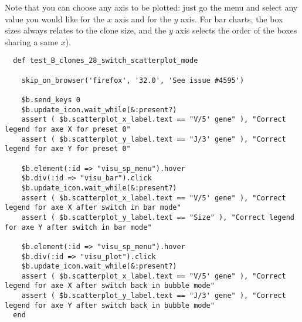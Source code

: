 Note that you can choose any axis to be plotted: just go the  menu and
select any value you would like for the $x$ axis and for the $y$ axis.
For bar charts, the box sizes always relates to the clone size,
and the $y$ axis selects the order of the boxes sharing a same $x$).


\begin{verbatim}
  def test_B_clones_28_switch_scatterplot_mode

    skip_on_browser('firefox', '32.0', 'See issue #4595')

    $b.send_keys 0
    $b.update_icon.wait_while(&:present?)
    assert ( $b.scatterplot_x_label.text == "V/5' gene" ), "Correct legend for axe X for preset 0"
    assert ( $b.scatterplot_y_label.text == "J/3' gene" ), "Correct legend for axe Y for preset 0"

    $b.element(:id => "visu_sp_menu").hover
    $b.div(:id => "visu_bar").click
    $b.update_icon.wait_while(&:present?)
    assert ( $b.scatterplot_x_label.text == "V/5' gene" ), "Correct legend for axe X after switch in bar mode"
    assert ( $b.scatterplot_y_label.text == "Size" ), "Correct legend for axe Y after switch in bar mode"

    $b.element(:id => "visu_sp_menu").hover
    $b.div(:id => "visu_plot").click
    $b.update_icon.wait_while(&:present?)
    assert ( $b.scatterplot_x_label.text == "V/5' gene" ), "Correct legend for axe X after switch back in bubble mode"
    assert ( $b.scatterplot_y_label.text == "J/3' gene" ), "Correct legend for axe Y after switch back in bubble mode"
  end
\end{verbatim}


